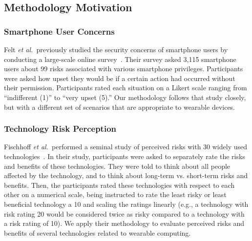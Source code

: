 \documentclass{acm_proc_article-sp}
\def\etal{{\it et al.~}}
\begin{document}


 
\subsection{Methodology Motivation}

\subsubsection{Smartphone User Concerns}
Felt \etal previously studied the security concerns of smartphone users by conducting a large-scale online survey~\cite{Felt}. Their survey asked 3,115 smartphone users about 99 risks associated with various smartphone privileges. Participants were asked how upset they would be if a certain action had occurred without their permission. Participants rated each situation on a Likert scale ranging from ``indifferent (1)'' to ``very upset (5).''
Our methodology follows that study closely, but with a different set of scenarios that are appropriate to wearable devices.

\subsubsection{Technology Risk Perception}
Fischhoff \etal performed a seminal study of perceived risks with 30 widely used technologies~\cite{Fischhoff}. In their study, participants were asked to separately rate the risks and benefits of these technologies. They were told to think about all people affected by the technology, and to think about long-term vs. short-term risks and benefits. Then, the participants rated these technologies with respect to each other on a numerical scale, being instructed to rate the least risky or least beneficial technology a 10 and scaling the ratings linearly (e.g., a technology with risk rating 20 would be considered twice as risky compared to a technology with a risk rating of 10).
We apply their methodology to evaluate perceived risks and benefits of several technologies related to wearable computing.
\end{document}
